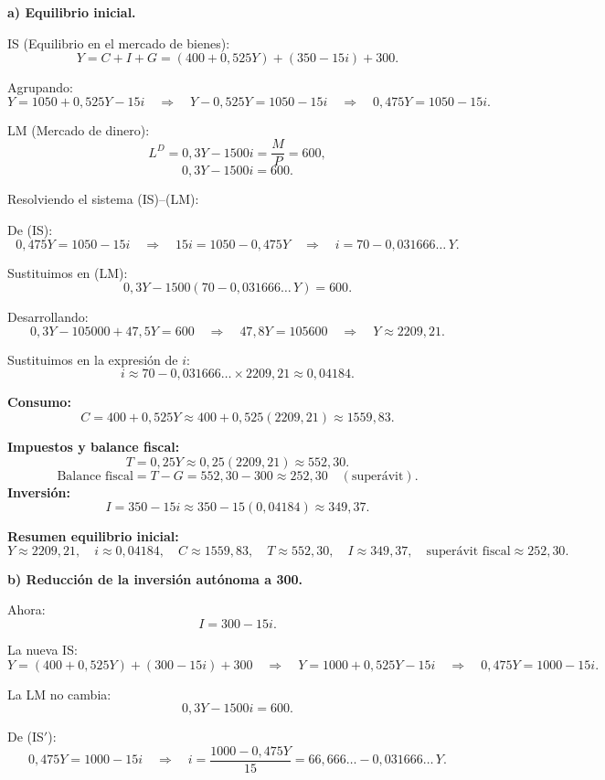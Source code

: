 \documentclass[11pt,addpoints]{article}
\begin{document}
\textbf{a) Equilibrio inicial.}

IS (Equilibrio en el mercado de bienes):
\[
Y = C + I + G = (400 + 0{,}525Y) + (350 - 15i) + 300.
\]

Agrupando:
\[
Y = 1050 + 0{,}525Y - 15i
\quad\Rightarrow\quad
Y - 0{,}525Y = 1050 - 15i
\quad\Rightarrow\quad
0{,}475Y = 1050 - 15i. \tag{IS}
\]

LM (Mercado de dinero):
\[
L^D = 0{,}3Y - 1500i = \frac{M}{P} = 600,
\]
\[
0{,}3Y - 1500i = 600. \tag{LM}
\]

Resolviendo el sistema (IS)–(LM):

De (IS):
\[
0{,}475Y = 1050 - 15i \quad\Rightarrow\quad 15i = 1050 - 0{,}475Y
\quad\Rightarrow\quad i = 70 - 0{,}031666\ldots\,Y.
\]

Sustituimos en (LM):
\[
0{,}3Y - 1500\left(70 - 0{,}031666\ldots\,Y\right) = 600.
\]

Desarrollando:
\[
0{,}3Y - 105000 + 47{,}5Y = 600
\quad\Rightarrow\quad
47{,}8Y = 105600
\quad\Rightarrow\quad
Y \approx 2209{,}21.
\]

Sustituimos en la expresión de $i$:
\[
i \approx 70 - 0{,}031666\ldots \times 2209{,}21 \approx 0{,}04184.
\]

\textbf{Consumo:}
\[
C = 400 + 0{,}525Y \approx 400 + 0{,}525(2209{,}21) \approx 1559{,}83.
\]

\textbf{Impuestos y balance fiscal:}
\[
T = 0{,}25Y \approx 0{,}25(2209{,}21) \approx 552{,}30.
\]
\[
\text{Balance fiscal} = T - G = 552{,}30 - 300 \approx 252{,}30 \quad (\text{superávit}).
\]
\newpage
\vspace*{0.5cm}
\textbf{Inversión:}
\[
I = 350 - 15i \approx 350 - 15(0{,}04184) \approx 349{,}37.
\]

\textbf{Resumen equilibrio inicial:}
\[
Y \approx 2209{,}21, \quad
i \approx 0{,}04184, \quad
C \approx 1559{,}83, \quad
T \approx 552{,}30, \quad
I \approx 349{,}37, \quad
\text{superávit fiscal} \approx 252{,}30.
\]

\bigskip
\textbf{b) Reducción de la inversión autónoma a 300.}

Ahora:
\[
I = 300 - 15i.
\]

La nueva IS:
\[
Y = (400 + 0{,}525Y) + (300 - 15i) + 300
\quad\Rightarrow\quad
Y = 1000 + 0{,}525Y - 15i
\quad\Rightarrow\quad
0{,}475Y = 1000 - 15i. \tag{IS$'$}
\]

La LM no cambia:
\[
0{,}3Y - 1500i = 600. \tag{LM}
\]

De (IS$'$):
\[
0{,}475Y = 1000 - 15i
\quad\Rightarrow\quad
i = \frac{1000 - 0{,}475Y}{15}
= 66{,}666\ldots - 0{,}031666\ldots\,Y.
\]
\end{document}
